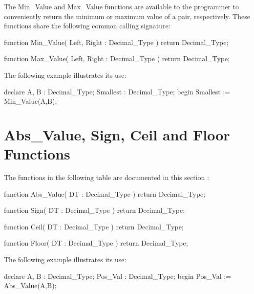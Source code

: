 \documentclass[english,letterpaper]{book}
\begin{document}
The Min\_Value and Max\_Value functions are available to the programmer
to conveniently return the minimum or maximum
value of a pair, respectively. These functions share the following
common calling signature:

\begin{Code}
function Min_Value(
   Left, Right : Decimal_Type
) return Decimal_Type;
\end{Code}

\begin{Code}
function Max_Value(
   Left, Right : Decimal_Type
) return Decimal_Type;
\end{Code}

The following example illustrates its use:

\begin{Example}
declare
   A, B :     Decimal_Type;
   Smallest : Decimal_Type;
begin
   Smallest := Min_Value(A,B);
\end{Example}

\section{Abs\_Value, Sign, Ceil and Floor Functions}

The functions in the following table are documented in this section
:

\begin{Code}
function Abs_Value(
   DT : Decimal_Type
) return Decimal_Type;
\end{Code}

\begin{Code}
function Sign(
   DT : Decimal_Type
) return Decimal_Type;
\end{Code}

\begin{Code}
function Ceil(
   DT : Decimal_Type
) return Decimal_Type;
\end{Code}

\begin{Code}
function Floor(
   DT : Decimal_Type
) return Decimal_Type;
\end{Code}

The following example illustrates its use:

\begin{Example}
declare
   A, B :    Decimal_Type;
   Pos_Val : Decimal_Type;
begin
   Pos_Val := Abs_Value(A,B);
\end{Example}
\end{document}
